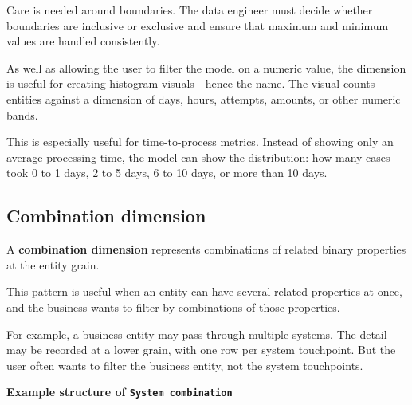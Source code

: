 \documentclass[10pt,openany,10pt]{book}
\begin{document}
Care is needed around boundaries. The data engineer must decide whether
boundaries are inclusive or exclusive and ensure that maximum and
minimum values are handled consistently.

As well as allowing the user to filter the model on a numeric value, the
dimension is useful for creating histogram visuals---hence the name. The
visual counts entities against a dimension of days, hours, attempts,
amounts, or other numeric bands.

This is especially useful for time-to-process metrics. Instead of
showing only an average processing time, the model can show the
distribution: how many cases took 0 to 1 days, 2 to 5 days, 6 to 10
days, or more than 10 days.

\subsection{Combination dimension}\label{combination-dimension}

A \textbf{combination dimension} represents combinations of related
binary properties at the entity grain.

This pattern is useful when an entity can have several related
properties at once, and the business wants to filter by combinations of
those properties.

For example, a business entity may pass through multiple systems. The
detail may be recorded at a lower grain, with one row per system
touchpoint. But the user often wants to filter the business entity, not
the system touchpoints.

\textbf{Example structure of
\texttt{\textquotesingle{}System\ combination\textquotesingle{}}}
\end{document}
